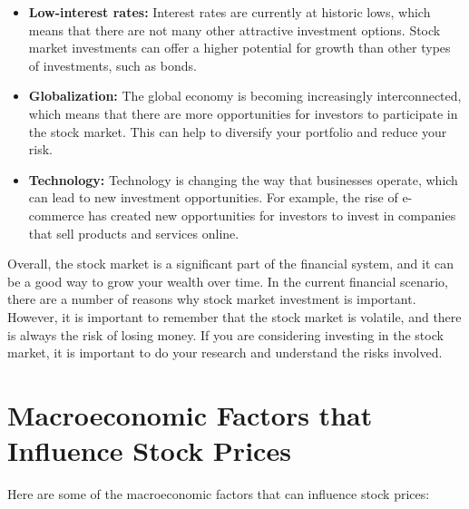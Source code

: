 \begin{itemize}
    \item \textbf{Low-interest rates:} Interest rates are currently at historic lows, which means that there are not many other attractive investment options. Stock market investments can offer a higher potential for growth than other types of investments, such as bonds.
    \item \textbf{Globalization:} The global economy is becoming increasingly interconnected, which means that there are more opportunities for investors to participate in the stock market. This can help to diversify your portfolio and reduce your risk.
    \item \textbf{Technology:} Technology is changing the way that businesses operate, which can lead to new investment opportunities. For example, the rise of e-commerce has created new opportunities for investors to invest in companies that sell products and services online.
\end{itemize}

Overall, the stock market is a significant part of the financial system, and it can be a good way to grow your wealth over time. In the current financial scenario, there are a number of reasons why stock market investment is important. However, it is important to remember that the stock market is volatile, and there is always the risk of losing money. If you are considering investing in the stock market, it is important to do your research and understand the risks involved.

\section{Macroeconomic Factors that Influence Stock Prices}

Here are some of the macroeconomic factors that can influence stock prices:

